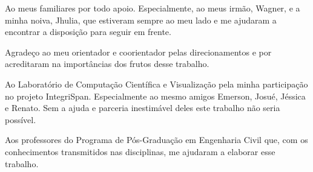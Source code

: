 \begin{agradecimentos}

Ao meus familiares por todo apoio. Especialmente, ao meus irmão, Wagner, e a minha noiva, Jhulia, que estiveram sempre ao meu lado e me ajudaram a encontrar a disposição para seguir em frente.

Agradeço ao meu orientador e coorientador pelas direcionamentos e por acreditaram na importâncias dos frutos desse trabalho.

Ao Laboratório de Computação Científica e Visualização pela minha participação no projeto IntegriSpan. Especialmente ao mesmo amigos Emerson, Josué, Jéssica e Renato. Sem a ajuda e parceria inestimável deles este trabalho não seria possível.

Aos professores do Programa de Pós-Graduação em Engenharia Civil que, com os conhecimentos transmitidos nas disciplinas, me ajudaram a elaborar esse trabalho.

\end{agradecimentos}
